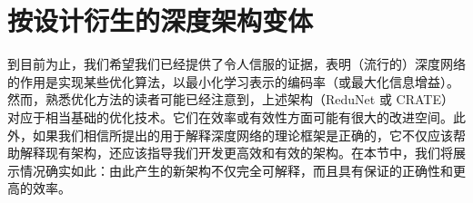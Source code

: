 \documentclass[../../book-main_zh.tex]{subfiles}
\begin{document}
\begin{table*}[t!]
\centering
\caption{\small \textsc{crate} 在不同模型规模下，在 ImageNet-1K 上预训练后，在各种数据集上的 Top-1 分类准确率。对于 ImageNet-1K/ImageNet-1K ReaL，我们直接评估 top-1 准确率。对于其他数据集，我们使用在 ImageNet 上预训练的模型作为初始化，并通过微调评估迁移学习性能。}
\label{tab:crate_comparison_with_sota}
\small
    \setlength{\tabcolsep}{13.6pt}
\end{table*}



\section{按设计衍生的深度架构变体} \label{sec:chap4-derive-white-box-transformer-variants}

到目前为止，我们希望我们已经提供了令人信服的证据，表明（流行的）深度网络的作用是实现某些优化算法，以最小化学习表示的编码率（或最大化信息增益）。然而，熟悉优化方法的读者可能已经注意到，上述架构（ReduNet 或 CRATE）对应于相当基础的优化技术。它们在效率或有效性方面可能有很大的改进空间。此外，如果我们相信所提出的用于解释深度网络的理论框架是正确的，它不仅应该帮助解释现有架构，还应该指导我们开发更高效和有效的架构。在本节中，我们将展示情况确实如此：由此产生的新架构不仅完全可解释，而且具有保证的正确性和更高的效率。
\end{document}
